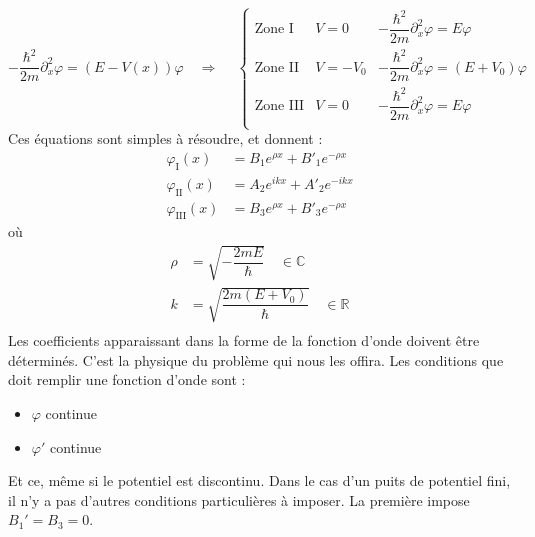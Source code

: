 \documentclass{book}
\begin{document}
\begin{equation}
  -\dfrac{\hbar^2}{2m} \partial_x ^2 \varphi = (E-V(x)) \varphi 
  \quad \Rightarrow \quad \ \left\{ 
    \begin{array}{lll}
      \text{Zone I} & V = 0 & -\dfrac{\hbar^2}{2m} \partial_x ^2 \varphi = E \varphi \\
      \text{Zone II} & V = -V_0 & -\dfrac{\hbar^2}{2m} \partial_x ^2 \varphi = (E+V_0) \varphi \\
      \text{Zone III} & V = 0 & -\dfrac{\hbar^2}{2m} \partial_x ^2 \varphi = E \varphi \\
    \end{array}
    \right. 
  \end{equation}
  Ces équations sont simples à résoudre, et donnent :
  \begin{align}
    \varphi_{\mathrm{I}}(x) &= B_1 e^{\rho x} + B' _1 e^{-\rho x} \\
    \varphi_{\mathrm{II}}(x) &= A_2 e^{ik x} + A' _2 e^{-ik x} \\
    \varphi_{\mathrm{III}}(x) &= B_3 e^{\rho x} + B' _3 e^{-\rho x} 
  \end{align}
  où
  \begin{align}
    \rho &= \sqrt{-\dfrac{2mE}{\hbar}} \quad \in \mathbb{C} \\
    k &= \sqrt{\dfrac{2m(E+V_0)}{\hbar}} \quad \in \mathbb{R} \\
  \end{align}
  Les coefficients apparaissant dans la forme de la fonction d'onde doivent être déterminés. C'est la physique du problème qui nous les offira. Les conditions que doit remplir une fonction d'onde sont :
  \begin{itemize}
    \item $\varphi$ continue 
    \item $\varphi'$ continue
  \end{itemize}
  Et ce, même si le potentiel est discontinu. Dans le cas d'un puits de potentiel fini, il n'y a pas d'autres conditions particulières à imposer. La première impose $B_1' = B_3 = 0$. \\
  
\end{document}
